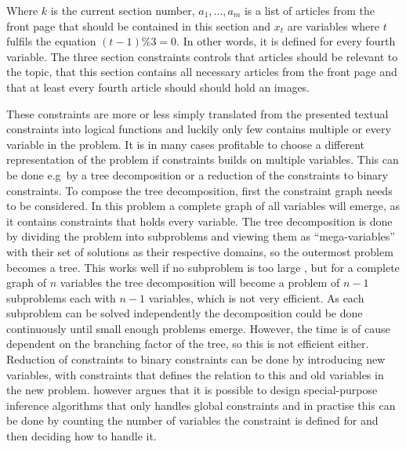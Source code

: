 Where $k$ is the current section number, $a_1,\dots,a_m$ is a list of articles from the front page that should be contained in this section and $x_t$ are variables where $t$ fulfils the equation $(t-1) \% 3 = 0$. In other words, it is defined for every fourth variable. The three section constraints controls that articles should be relevant to the topic, that this section contains all necessary articles from the front page and that at least every fourth article should should hold an images.

These constraints are more or less simply translated from the presented textual constraints into logical functions and luckily only few contains multiple or every variable in the problem. It is in many cases profitable to choose a different representation of the problem if constraints builds on multiple variables. This can be done e.g\ by a tree decomposition or a reduction of the constraints to binary constraints. To compose the tree decomposition, first the constraint graph needs to be considered. In this problem a complete graph of all variables will emerge, as it contains constraints that holds every variable. The tree decomposition is done by dividing the problem into subproblems and viewing them as ``mega-variables'' with their set of solutions as their respective domains, so the outermost problem becomes a tree. This works well if no subproblem is too large \cite{AIRussell}, but for a complete graph of $n$ variables the tree decomposition will become a problem of $n-1$ subproblems each with $n-1$ variables, which is not very efficient. As each subproblem can be solved independently the decomposition could be done continuously until small enough problems emerge. However, the time is of cause dependent on the branching factor of the tree, so this is not efficient either. Reduction of constraints to binary constraints can be done by introducing new variables, with constraints that defines the relation to this and old variables in the new problem. \cite{AIRussell} however argues that it is possible to design special-purpose inference algorithms that only handles global constraints and in practise this can be done by counting the number of variables the constraint is defined for and then deciding how to handle it.


